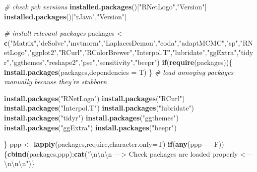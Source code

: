 \documentclass[10,portrait]{article}
\newenvironment{Shaded}{\begin{snugshade}}{\end{snugshade}}
\newcommand{\KeywordTok}[1]{\textcolor[rgb]{0.13,0.29,0.53}{\textbf{#1}}}
\newcommand{\DataTypeTok}[1]{\textcolor[rgb]{0.13,0.29,0.53}{#1}}
\newcommand{\CharTok}[1]{\textcolor[rgb]{0.31,0.60,0.02}{#1}}
\newcommand{\StringTok}[1]{\textcolor[rgb]{0.31,0.60,0.02}{#1}}
\newcommand{\CommentTok}[1]{\textcolor[rgb]{0.56,0.35,0.01}{\textit{#1}}}
\newcommand{\ControlFlowTok}[1]{\textcolor[rgb]{0.13,0.29,0.53}{\textbf{#1}}}
\newcommand{\OperatorTok}[1]{\textcolor[rgb]{0.81,0.36,0.00}{\textbf{#1}}}
\newcommand{\NormalTok}[1]{#1}
\begin{document}
\begin{Shaded}
\begin{Highlighting}[]
  \CommentTok{# check pck versions}
  \KeywordTok{installed.packages}\NormalTok{()[}\StringTok{"RNetLogo"}\NormalTok{,}\StringTok{"Version"}\NormalTok{] }
  \KeywordTok{installed.packages}\NormalTok{()[}\StringTok{"rJava"}\NormalTok{,}\StringTok{"Version"}\NormalTok{]}
  
  \CommentTok{# install relevant packages   }
\NormalTok{  packages <-}\StringTok{ }\KeywordTok{c}\NormalTok{(}\StringTok{"Matrix"}\NormalTok{,}\StringTok{"deSolve"}\NormalTok{,}\StringTok{"mvtnorm"}\NormalTok{,}\StringTok{"LaplacesDemon"}\NormalTok{,}\StringTok{"coda"}\NormalTok{,}\StringTok{"adaptMCMC"}\NormalTok{,}\StringTok{"sp"}\NormalTok{,}\StringTok{"RNetLogo"}\NormalTok{,}\StringTok{"ggplot2"}\NormalTok{,}\StringTok{"RCurl"}\NormalTok{,}\StringTok{"RColorBrewer"}\NormalTok{,}\StringTok{"Interpol.T"}\NormalTok{,}\StringTok{"lubridate"}\NormalTok{,}\StringTok{"ggExtra"}\NormalTok{,}\StringTok{"tidyr"}\NormalTok{,}\StringTok{"ggthemes"}\NormalTok{,}\StringTok{"reshape2"}\NormalTok{,}\StringTok{"pse"}\NormalTok{,}\StringTok{"sensitivity"}\NormalTok{,}\StringTok{"beepr"}\NormalTok{)  }
  \ControlFlowTok{if}\NormalTok{(}\KeywordTok{require}\NormalTok{(packages))\{}
    \KeywordTok{install.packages}\NormalTok{(packages,}\DataTypeTok{dependencies =}\NormalTok{ T)}
\NormalTok{  \}}
  \CommentTok{# load annoying packages manually because they're stubborn }
  
  \KeywordTok{install.packages}\NormalTok{(}\StringTok{"RNetLogo"}\NormalTok{)}
  \KeywordTok{install.packages}\NormalTok{(}\StringTok{"RCurl"}\NormalTok{)}
  \KeywordTok{install.packages}\NormalTok{(}\StringTok{"Interpol.T"}\NormalTok{)}
  \KeywordTok{install.packages}\NormalTok{(}\StringTok{"lubridate"}\NormalTok{)}
  \KeywordTok{install.packages}\NormalTok{(}\StringTok{"tidyr"}\NormalTok{)}
  \KeywordTok{install.packages}\NormalTok{(}\StringTok{"ggthemes"}\NormalTok{)}
  \KeywordTok{install.packages}\NormalTok{(}\StringTok{"ggExtra"}\NormalTok{)}
  \KeywordTok{install.packages}\NormalTok{(}\StringTok{"beepr"}\NormalTok{)}
  
\NormalTok{\}}
\NormalTok{ppp <-}\StringTok{ }\KeywordTok{lapply}\NormalTok{(packages,require,}\DataTypeTok{character.only=}\NormalTok{T)}
\ControlFlowTok{if}\NormalTok{(}\KeywordTok{any}\NormalTok{(ppp}\OperatorTok{==}\NormalTok{F))\{}\KeywordTok{cbind}\NormalTok{(packages,ppp);}\KeywordTok{cat}\NormalTok{(}\StringTok{"}\CharTok{\textbackslash{}n\textbackslash{}n\textbackslash{}n}\StringTok{ ---> Check packages are loaded properly <--- }\CharTok{\textbackslash{}n\textbackslash{}n\textbackslash{}n}\StringTok{"}\NormalTok{)\}}


\end{Highlighting}
\end{Shaded}
\end{document}
